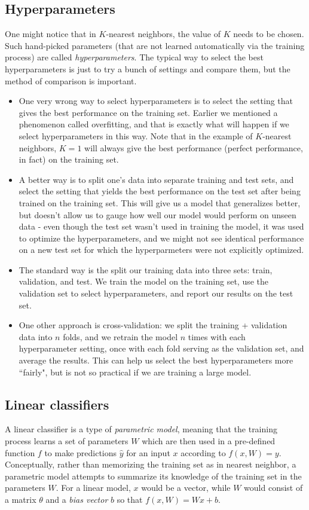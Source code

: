 \subsection{Hyperparameters}
One might notice that in $K$-nearest neighbors, the value of $K$ needs to be chosen. Such hand-picked parameters (that are not learned automatically via the training process) are called \emph{hyperparameters}. The typical way to select the best hyperparameters is just to try a bunch of settings and compare them, but the method of comparison is important.
\begin{itemize}
\item One very wrong way to select hyperparameters is to select the setting that gives the best performance on the training set. Earlier we mentioned a phenomenon called overfitting, and that is exactly what will happen if we select hyperparameters in this way. Note that in the example of $K$-nearest neighbors, $K=1$ will always give the best performance (perfect performance, in fact) on the training set.
\item A better way is to split one's data into separate training and test sets, and select the setting that yields the best performance on the test set after being trained on the training set. This will give us a model that generalizes better, but doesn't allow us to gauge how well our model would perform on unseen data - even though the test set wasn't used in training the model, it was used to optimize the hyperparameters, and we might not see identical performance on a new test set for which the hyperparmeters were not explicitly optimized.
\item The standard way is the split our training data into three sets: train, validation, and test. We train the model on the training set, use the validation set to select hyperparameters, and report our results on the test set.
\item One other approach is cross-validation: we split the training + validation data into $n$ folds, and we retrain the model $n$ times with each hyperparameter setting, once with each fold serving as the validation set, and average the results. This can help us select the best hyperparameters more ``fairly", but is not so practical if we are training a large model.
\end{itemize}

\subsection{Linear classifiers}
A linear classifier is a type of \emph{parametric model}, meaning that the training process learns a set of parameters $W$ which are then used in a pre-defined function $f$ to make predictions $\hat{y}$ for an input $x$ according to $f(x, W) = y$. Conceptually, rather than memorizing the training set as in nearest neighbor, a parametric model attempts to summarize its knowledge of the training set in the parameters $W$. For a linear model, $x$ would be a vector, while $W$ would consist of a matrix $\theta$ and a \emph{bias vector} $b$ so that $f(x, W) = Wx + b$. 

